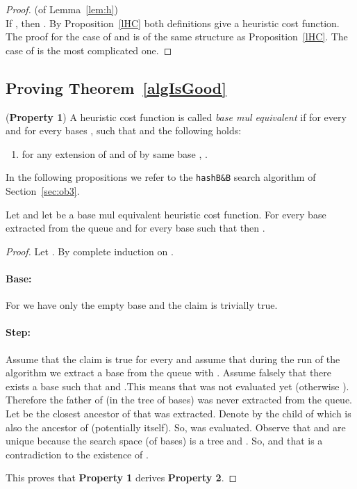 \documentclass[envcountsame]{llncs}
\begin{document}
\begin{proof}(of Lemma~\ref{lem:h})\\
  If , then .  By Proposition~\ref{lHC} both
  definitions give a heuristic cost function. 
  The proof for the case of  and  
   is of the same structure as Proposition~\ref{lHC}. The case of  is the most complicated one.
\end{proof}

\subsection{Proving Theorem~\ref{algIsGood}}

\begin{definition}(\textbf{Property 1})
\label{dBME}
A heuristic cost function  is
called \emph{base mul equivalent} if for every  and
for every bases ,  such that  and
 the following holds:
\begin{enumerate}
   \item for any extension of  and of  by same base ,
          .
\end{enumerate}
\end{definition} 

In the following propositions we refer to the \texttt{hashB\&B}
search algorithm of Section~\ref{sec:ob3}.


\begin{proposition}
\label{pBestRep}
Let  and let 
be a base mul equivalent heuristic cost function.  For every base
 extracted from the queue and for every base  such that
 then .
\end{proposition}

\begin{proof}
Let . By complete induction on .

\paragraph{\bf Base:} 

For  we have only the empty base and the claim is trivially true.

\paragraph{\bf Step:}  

Assume that the claim is true for every  and assume that during
the run of the algorithm we extract a base  from the queue with
. Assume falsely that there exists a base  such that
 and .This
means that  was not evaluated yet (otherwise ).
Therefore the father of  (in the tree of bases) was never
extracted from the queue.  Let  be the closest ancestor of 
that was extracted. Denote by  the child of  which is also
the ancestor of  (potentially  itself). So,  was
evaluated.  Observe that  and  are unique because the search
space (of bases) is a tree and . So,
 and that is a contradiction to the existence of
.  \bigskip

\noindent This proves that \textbf{Property 1} derives
\textbf{Property 2}.
\end{proof} 
\end{document}
